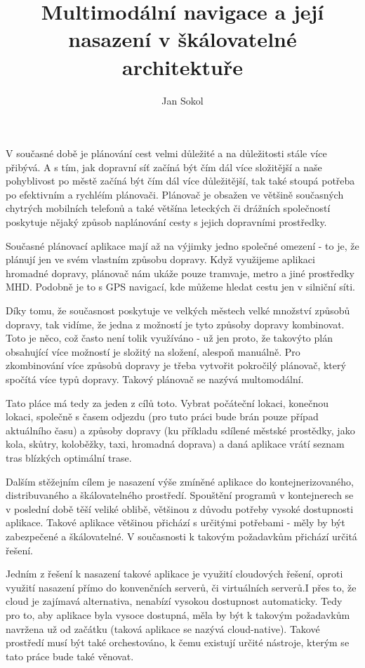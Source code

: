 \documentclass[thesis=M,czech]{FITthesis}[2019/12/23]
\title{Multimodální navigace a její nasazení v škálovatelné architektuře}
\author{Jan Sokol} %
\theoremstyle{plain}
\theoremstyle{definition}
\begin{document}

\begin{introduction}
V současné době je plánování cest velmi důležité a na důležitosti stále více přibývá. A s tím, jak dopravní síť začíná být čím dál více složitější a naše pohyblivost po městě začíná být čím dál více důležitější, tak také stoupá potřeba po efektivním a rychléím plánovači. Plánovač je obsažen ve většině současných chytrých mobilních telefonů a také většína leteckých či drážních společností poskytuje nějaký způsob naplánování cesty s jejich dopravními prostředky. 

Současné plánovací aplikace mají až na výjimky jedno společné omezení - to je, že plánují jen ve svém vlastním způsobu dopravy. Když využijeme aplikaci hromadné dopravy, plánovač nám ukáže pouze tramvaje, metro a jiné prostředky MHD. Podobně je to s GPS navigací, kde můžeme hledat cestu jen v silniční síti. 

Díky tomu, že současnost poskytuje ve velkých městech velké množství způsobů dopravy,  tak vidíme, že jedna z možností je tyto způsoby dopravy kombinovat. Toto je něco, což často není tolik využíváno - už jen proto, že takovýto plán obsahující více možností je složitý na složení, alespoň manuálně. Pro zkombinování více způsobů dopravy je třeba vytvořit pokročilý plánovač, který spočítá více typů dopravy. Takový plánovač se nazývá multomodální.

Tato pláce má tedy za jeden z cílů toto. Vybrat počáteční lokaci, konečnou lokaci, společně s časem odjezdu (pro tuto práci bude brán pouze případ aktuálního času)  a způsoby dopravy (ku příkladu sdílené městské prostědky, jako kola, skůtry, koloběžky, taxi, hromadná doprava) a daná aplikace vrátí seznam tras blízkých optimální trase. 

Dalším stěžejním cílem je nasazení výše zmíněné aplikace do kontejnerizovaného, distribuvaného a škálovatelného prostředí. Spouštění programů v kontejnerech se v poslední době těší veliké oblibě, většinou z důvodu potřeby vysoké dostupnosti aplikace. Takové aplikace většinou přichází s určitými potřebami - měly by  být zabezpečené a  škálovatelné. V současnosti k takovým požadavkům přichází určitá řešení. 

Jedním z řešení k nasazení takové aplikace je využití cloudových řešení, oproti využití nasazení přímo do konvenčních serverů, či virtuálních serverů.I přes to, že cloud je zajímavá alternativa, nenabízí vysokou dostupnost automaticky. Tedy pro to, aby aplikace byla vysoce dostupná, měla by být k takovým požadavkům navržena už od začátku (taková aplikace se nazývá cloud-native). Takové prostředí musí být také orchestováno, k čemu existují určité nástroje, kterým se tato práce bude také věnovat. 


\end{introduction}
\end{document}
